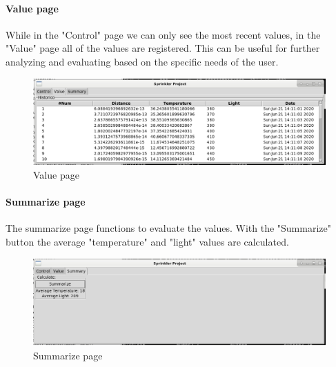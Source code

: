 \documentclass{article}
\begin{document}
\paragraph{Value page}
While in the "Control" page we can only see the most recent values, in the "Value" page all of the values are registered. This can be useful for further analyzing and evaluating based on the specific needs of the user.
\begin{figure}
\centering
\includegraphics[scale=0.3]{value_view.png}
\caption{Value page}
\label{fig:value}
\end{figure}
\paragraph{Summarize page}
The summarize page functions to evaluate the values. With the "Summarize" button the average "temperature" and "light" values are calculated.
\begin{figure}
\centering
\includegraphics[scale=0.3]{summarize_view.png}
\caption{Summarize page}
\label{fig:summarize}
\end{figure}
\end{document}

